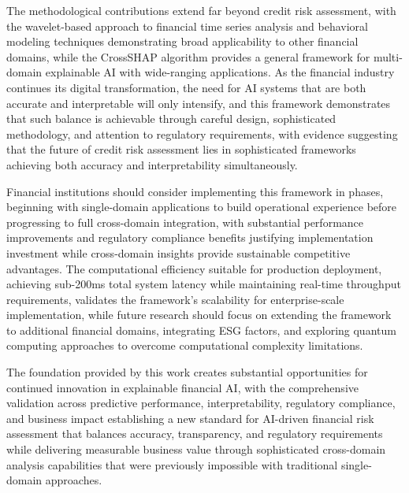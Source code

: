 \documentclass[a4 paper, 11pt,twoside]{article}
\newcommand{\0}{\Bf{0}}
\theoremstyle{definition}
\begin{document}
The methodological contributions extend far beyond credit risk assessment, with the wavelet-based approach to financial time series analysis and behavioral modeling techniques demonstrating broad applicability to other financial domains, while the CrossSHAP algorithm provides a general framework for multi-domain explainable AI with wide-ranging applications. As the financial industry continues its digital transformation, the need for AI systems that are both accurate and interpretable will only intensify, and this framework demonstrates that such balance is achievable through careful design, sophisticated methodology, and attention to regulatory requirements, with evidence suggesting that the future of credit risk assessment lies in sophisticated frameworks achieving both accuracy and interpretability simultaneously.

Financial institutions should consider implementing this framework in phases, beginning with single-domain applications to build operational experience before progressing to full cross-domain integration, with substantial performance improvements and regulatory compliance benefits justifying implementation investment while cross-domain insights provide sustainable competitive advantages. The computational efficiency suitable for production deployment, achieving sub-200ms total system latency while maintaining real-time throughput requirements, validates the framework's scalability for enterprise-scale implementation, while future research should focus on extending the framework to additional financial domains, integrating ESG factors, and exploring quantum computing approaches to overcome computational complexity limitations.

The foundation provided by this work creates substantial opportunities for continued innovation in explainable financial AI, with the comprehensive validation across predictive performance, interpretability, regulatory compliance, and business impact establishing a new standard for AI-driven financial risk assessment that balances accuracy, transparency, and regulatory requirements while delivering measurable business value through sophisticated cross-domain analysis capabilities that were previously impossible with traditional single-domain approaches.
\end{document}
